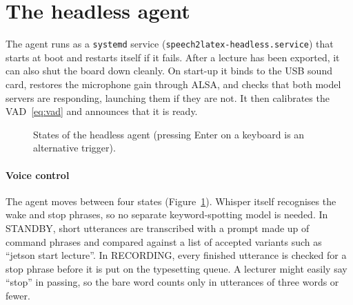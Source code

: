 \documentclass[11pt,a4paper,oneside]{report}
\theoremstyle{definition}
\newcommand{\code}[1]{\texttt{\small #1}}
\begin{document}
\section{The headless agent}
\label{sec:headless}
The agent runs as a \texttt{systemd} service (\code{speech2latex-headless.service}) that starts at boot and restarts itself if it fails. After a lecture has been exported, it can also shut the board down cleanly. On start-up it binds to the USB sound card, restores the microphone gain through ALSA, and checks that both model servers are responding, launching them if they are not. It then calibrates the VAD~\eqref{eq:vad} and announces that it is ready.

\begin{figure}[ht]
\centering
{}
\caption{States of the headless agent (pressing Enter on a keyboard is an alternative trigger).}
\label{fig:fsm}
\end{figure}

\paragraph{Voice control} The agent moves between four states (Figure~\ref{fig:fsm}). Whisper itself recognises the wake and stop phrases, so no separate keyword-spotting model is needed. In STANDBY, short utterances are transcribed with a prompt made up of command phrases and compared against a list of accepted variants such as ``jetson start lecture''. In RECORDING, every finished utterance is checked for a stop phrase before it is put on the typesetting queue. A lecturer might easily say ``stop'' in passing, so the bare word counts only in utterances of three words or fewer.
\end{document}
